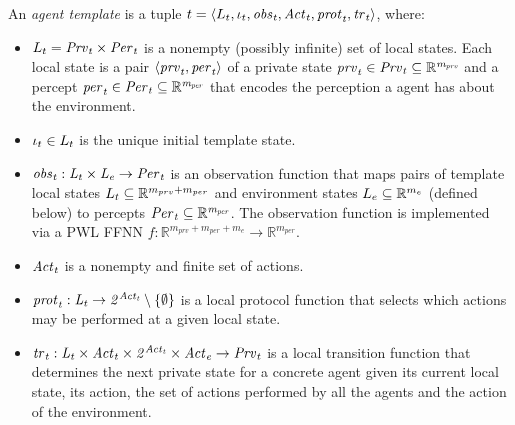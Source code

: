 \begin{definition}
An {\em agent template} is a tuple ${t} = \left \langle L_{t}, \iota_{t}, \it{obs}_{t},
\it{Act}_{t}, \it{prot}_{t}, \it{tr}_{t}  \right \rangle$, where:
\begin{itemize}
  \item $L_{t} = \it{Prv}_{t} \times \it{Per}_{t}$ is a nonempty (possibly infinite)
  set of local states.  Each local state  is a pair $\left \langle \it{prv}_{t}, \it{per}_{t} \right \rangle$ of
  a private state $\it{prv}_{t} \in \it{Prv}_{t} \subseteq \mathbb R^{m_{prv}}$ and a
  percept $\it{per}_{t} \in \it{Per}_{t} \subseteq \mathbb R^{m_{per}}$ that encodes the
  perception a agent has about the environment.  

  \item $\iota_{t} \in L_{t}$ is the unique initial template state.
  
  \item $\it{obs}_{t} : L_{t} \times L_{e} \rightarrow \it{Per}_{t}$ is an
  observation function that maps pairs of template local states $L_{t}
  \subseteq \mathbb{R}^{m_{prv} + m_{per}}$ and environment states $L_{e}
  \subseteq \mathbb{R}^{m_e}$ (defined below) to percepts $\it{Per}_{t} \subseteq
  \mathbb{R}^{m_{per}}$. The observation function is implemented via a PWL FFNN $f :
  \mathbb{R}^{m_{prv} + m_{per} + m_e} \rightarrow \mathbb{R}^{m_{per}}$.

  \item $\it{Act}_{t}$ is a nonempty and finite set of actions.
  
  \item $\it{prot}_{t} : L_{t} \rightarrow 2^{\it{Act}_{t}} \setminus \left \{ \emptyset \right \}$
  is a local protocol function that selects which actions may be performed at a
  given local state.%

  \item $\it{tr}_{t}: L_{t} \times \it{Act}_{t} \times 2^{\it{Act}_{t}} \times \it{Act}_{e} 
  \rightarrow \it{Prv}_{t}$ is a local transition function  that determines the next
  private state for a concrete agent given its current local state, its action, 
  the set of actions performed by all the agents  and the action of the
  environment.
  
\end{itemize}  
\end{definition}

